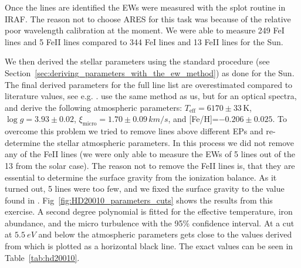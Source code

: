\documentclass{aa}
\begin{document}
Once the lines are identified the EWs were measured with the splot
routine in IRAF. The reason not to choose ARES for this task was because
of the relative poor wavelength calibration at the moment. We were able
to measure 249 FeI lines and 5 FeII lines compared to 344 FeI lines and
13 FeII lines for the Sun.

We then derived the stellar parameters using the standard procedure
(see Section~\ref{sec:deriving_parameters_with_the_ew_method}) as
done for the Sun. The final derived parameters for the full line
list are overestimated compared to literature values, see e.g.
\citet{Mortier2013,Gonzalez2010}. \cite{Gonzalez2010} use the same
method as us, but for an optical spectra, and derive the following
atmospheric parameters: $T_\mathrm{eff}=6170\pm33\,\si{\kelvin}$,
$\log g=3.93\pm0.02$, $\xi_\mathrm{micro}=1.70\pm0.09\,\si{km/s}$,
and [Fe/H]=$-0.206\pm0.025$. To overcome this problem we tried
to remove lines above different EPs and re-determine the stellar
atmospheric parameters. In this process we did not remove any of the
FeII lines (we were only able to measure the EWs of 5 lines out of
the 13 from the solar case). The reason not to remove the FeII lines
is, that they are essential to determine the surface gravity from the
ionization balance. As it turned out, 5 lines were too few, and we
fixed the surface gravity to the value found in \cite{Gonzalez2010}.
Fig~\ref{fig:HD20010_parameters_cuts} shows the results from this
exercise. A second degree polynomial is fitted for the effective
temperature, iron abundance, and the micro turbulence with the
95\% confidence interval. At a cut at $\SI{5.5}{eV}$ and below
the atmospheric parameters gets close to the values derived from
\cite{Gonzalez2010} which is plotted as a horizontal black line. The
exact values can be seen in Table~\ref{tab:hd20010}.
\end{document}
